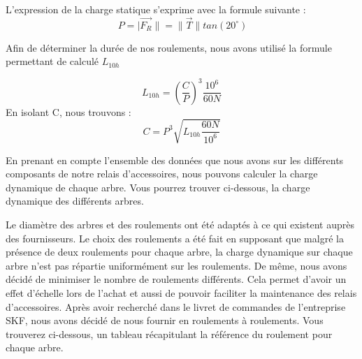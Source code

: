 \documentclass{config}
\begin{document}
\begin{spacing}{1.2}
L'expression de la charge statique s'exprime avec la formule suivante :
\[\ P = | \vec{F_R} \| = \| \vec{T} \| tan(20^\circ{})\]

Afin de déterminer la durée de nos roulements, nous avons utilisé la formule permettant de calculé $L_{10h}$

\[L_{10h} = (\frac{C}{P})^3 \frac{10^6}{60N}  \]
En isolant C, nous trouvons :
\[C = P^3\sqrt{L_{10h} \frac{60N}{10^6}}  \]

En prenant en compte l'ensemble des données que nous avons sur les différents composants de notre relais d'accessoires, nous pouvons calculer la charge dynamique de chaque arbre. Vous pourrez trouver ci-dessous, la charge dynamique des différents arbres.

\begin{table}[h]
\centering
{}
\end{table}

Le diamètre des arbres et des roulements ont été adaptés à ce qui existent auprès des fournisseurs. Le choix des roulements a été fait en supposant que malgré la présence de deux roulements pour chaque arbre, la charge dynamique sur chaque arbre n'est pas répartie uniformément sur les roulements. De même, nous avons décidé de minimiser le nombre de roulements différents. Cela permet d'avoir un effet d'échelle lors de l'achat et aussi de pouvoir faciliter la maintenance des relais d'accessoires.
Après avoir recherché dans le livret de commandes de l'entreprise SKF, nous avons décidé de nous fournir en roulements à roulements. Vous trouverez ci-dessous, un tableau récapitulant la référence du roulement pour chaque arbre.


\end{spacing}
\end{document}
